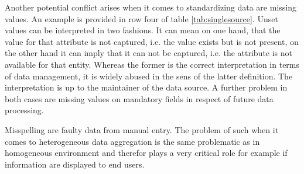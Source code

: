 
Another potential conflict arises when it comes to standardizing data are missing values. An example is provided in row four of table \ref{tab:singlesource}. Unset values can be interpreted in two fashions. It can mean on one hand, that the value for that attribute is not captured, i.e. the value exists but is not present, on the other hand it can imply that it can not be captured, i.e. the attribute is not available for that entity. Whereas the former is the correct interpretation in terms of data management, it is widely abused in the sens of the latter definition. The interpretation is up to the maintainer of the data source. A further problem in both cases are missing values on mandatory fields in respect of future data processing.

Misspelling are faulty data from manual entry. The problem of such when it comes to heterogeneous data aggregation is the same problematic as in homogeneous environment and therefor plays a very critical role for example if information are displayed to end users.  

\begin{table}[htb]
\centering
{}
\caption{Examples of single source problems}
\label{tab:singlesource}
\end{table}

